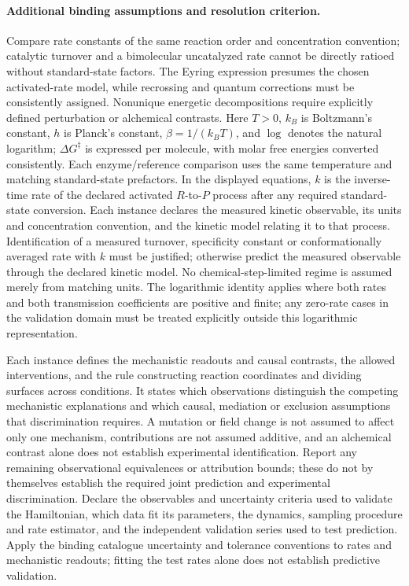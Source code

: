 \documentclass[11pt]{article}
\begin{document}
\paragraph{Additional binding assumptions and resolution criterion.} Compare rate constants of the same reaction order and concentration convention; catalytic turnover and a bimolecular uncatalyzed rate cannot be directly ratioed without standard-state factors. The Eyring expression presumes the chosen activated-rate model, while recrossing and quantum corrections must be consistently assigned. Nonunique energetic decompositions require explicitly defined perturbation or alchemical contrasts. Here $T>0$, $k_B$ is Boltzmann's constant, $h$ is Planck's constant, $\beta=1/(k_BT)$, and $\log$ denotes the natural logarithm; $\Delta G^\ddagger$ is expressed per molecule, with molar free energies converted consistently. Each enzyme/reference comparison uses the same temperature and matching standard-state prefactors. In the displayed equations, $k$ is the inverse-time rate of the declared activated $R$-to-$P$ process after any required standard-state conversion. Each instance declares the measured kinetic observable, its units and concentration convention, and the kinetic model relating it to that process. Identification of a measured turnover, specificity constant or conformationally averaged rate with $k$ must be justified; otherwise predict the measured observable through the declared kinetic model. No chemical-step-limited regime is assumed merely from matching units. The logarithmic identity applies where both rates and both transmission coefficients are positive and finite; any zero-rate cases in the validation domain must be treated explicitly outside this logarithmic representation.

Each instance defines the mechanistic readouts and causal contrasts, the allowed interventions, and the rule constructing reaction coordinates and dividing surfaces across conditions. It states which observations distinguish the competing mechanistic explanations and which causal, mediation or exclusion assumptions that discrimination requires. A mutation or field change is not assumed to affect only one mechanism, contributions are not assumed additive, and an alchemical contrast alone does not establish experimental identification. Report any remaining observational equivalences or attribution bounds; these do not by themselves establish the required joint prediction and experimental discrimination. Declare the observables and uncertainty criteria used to validate the Hamiltonian, which data fit its parameters, the dynamics, sampling procedure and rate estimator, and the independent validation series used to test prediction. Apply the binding catalogue uncertainty and tolerance conventions to rates and mechanistic readouts; fitting the test rates alone does not establish predictive validation.
\end{document}
